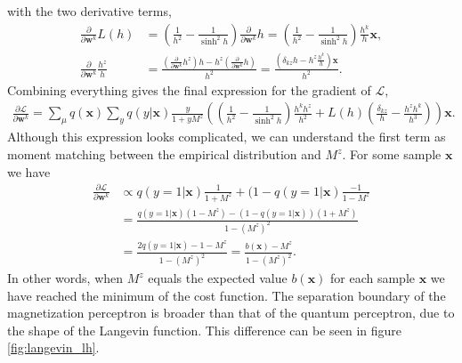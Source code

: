 with the two derivative terms,
\begin{align*}
    \frac{\partial}{\partial \mathbf{w}^k} L(h) &= \left(\frac{1}{h^2} - \frac{1}{\sinh^2{h}} \right) \frac{\partial}{\partial \mathbf{w}^k}h = \left( \frac{1}{h^2} - \frac{1}{\sinh^2{h}}\right) \frac{h^k}{h} \mathbf{x},\\
    \frac{\partial}{\partial \mathbf{w}^k}\frac{h^z}{h} &= \frac{\left(\frac{\partial}{\partial \mathbf{w}^k} h^z\right) h - h^z\left(\frac{\partial}{\partial \mathbf{w}^k} h\right)}{h^2} = \frac{\left(\delta_{kz}h - h^z\frac{h^k}{h} \right)\mathbf{x}}{h^2}.
\end{align*}
Combining everything gives the final expression for the gradient of $\mathcal{L}$,
\begin{align*}
    \frac{\partial \mathcal{L}}{\partial \mathbf{w}^k} = \sum_\mu q(\mathbf{x}) \sum_y q(y|\mathbf{x}) \frac{y}{1+y M^z} \left(\left( \frac{1}{h^2} - \frac{1}{\sinh^2{h}}\right) \frac{h^k h^z}{h^2} + L(h)\left(\frac{\delta_{kz}}{h} - \frac{h^zh^k}{h^3}\right)\right)\mathbf{x}.
\end{align*}
Although this expression looks complicated, we can understand the first term as moment matching between the empirical distribution and $M^z$. For some sample $\mathbf{x}$ we have
\begin{align*}
    \frac{\partial \mathcal{L}}{\partial \mathbf{w}^k} &\propto q(y=1|\mathbf{x})\frac{1}{1+ M^z} + (1 - q(y=1|\mathbf{x})\frac{-1}{1- M^z}\\
    & = \frac{q(y=1|\mathbf{x})(1- M^z)-(1 - q(y=1|\mathbf{x}))(1 + M^z)}{1- (M^z)^2}\\
    & = \frac{2q(y=1|\mathbf{x})-1- M^z}{1- (M^z)^2} = \frac{b(\mathbf{x})- M^z}{1- (M^z)^2}.
\end{align*}
In other words, when $M^z$ equals the expected value $b(\mathbf{x})$ for each sample $\mathbf{x}$ we have reached the minimum of the cost function. The separation boundary of the magnetization perceptron is broader than that of the quantum perceptron, due to the shape of the Langevin function. This difference can be seen in figure \ref{fig:langevin_lh}.\newline

